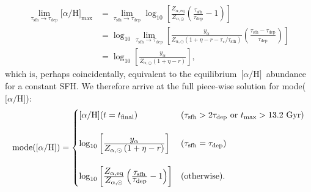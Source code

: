 \documentclass[12pt]{article}
\newcommand{\ddfrac}[2]{\frac{\displaystyle{#1}}{\displaystyle{#2}}}
\newcommand{\ah}{\ensuremath{\text{[$\alpha$/H]}}}
\newcommand{\timescale}[1]{\ensuremath{\tau_\text{#1}}}
\begin{document}
\begin{subequations}\begin{align}
\lim_{\timescale{sfh} \rightarrow \timescale{dep}} \ah_\text{max}
&= \lim_{\timescale{sfh} \rightarrow \timescale{dep}} \log_{10}
\left[\frac{Z_{\alpha,\text{eq}}}{Z_{\alpha,\odot}}
\left(\frac{\timescale{sfh}}{\timescale{dep}} - 1\right)\right]
\\
&= \log_{10} \lim_{\timescale{sfh} \rightarrow \timescale{dep}} \left[
\frac{y_\alpha}{
	Z_{\alpha,\odot} \left(1 + \eta - r - \tau_\star / \timescale{sfh}\right)
}
\left(\frac{\timescale{sfh} - \timescale{dep}}{\timescale{dep}}\right)
\right]
\\
&= \log_{10} \left[
\frac{y_\alpha}{
	Z_{\alpha,\odot} \left(1 + \eta - r\right)
}
\right],
\end{align}\end{subequations}
which is, perhaps coincidentally, equivalent to the equilibrium~\ah~abundance
for a constant SFH.
We therefore arrive at the full piece-wise solution for mode(\ah):
\begin{equation}
\text{mode}(\ah) = \begin{cases}
\ah(t = t_\text{final}) & (\timescale{sfh} > 2\timescale{dep}~\text{or}~
t_\text{max} > 13.2~\text{Gyr})
\\
\null
\\
\log_{10} \left[
\ddfrac{y_\alpha}{
	Z_{\alpha,\odot} \left(1 + \eta - r\right)
}
\right] & (\timescale{sfh} = \timescale{dep})
\\
\null
\\
\log_{10}\left[
\ddfrac{Z_{\alpha,\text{eq}}}{Z_{\alpha,\odot}}
\left(\ddfrac{\timescale{sfh}}{\timescale{dep}} - 1\right)
\right] & (\text{otherwise}).
\end{cases}
\label{eq:mode-ah-expsfh-piecewise}
\end{equation}
\end{document}
